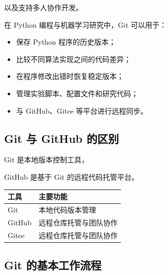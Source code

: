 以及支持多人协作开发。



在 Python 编程与机器学习研究中，Git 可以用于：



\begin{itemize}

    \item 保存 Python 程序的历史版本；

    \item 比较不同算法实现之间的代码差异；

    \item 在程序修改出错时恢复稳定版本；

    \item 管理实验脚本、配置文件和研究代码；

    \item 与 GitHub、Gitee 等平台进行远程同步。

\end{itemize}



\subsection{Git 与 GitHub 的区别}



Git 是本地版本控制工具，

GitHub 是基于 Git 的远程代码托管平台。



\begin{center}

\begin{tabular}{ll}

\hline

工具 & 主要功能 \\

\hline

Git & 本地代码版本管理 \\

GitHub & 远程仓库托管与团队协作 \\

Gitee & 远程仓库托管与团队协作 \\

\hline

\end{tabular}

\end{center}



\subsection{Git 的基本工作流程}



